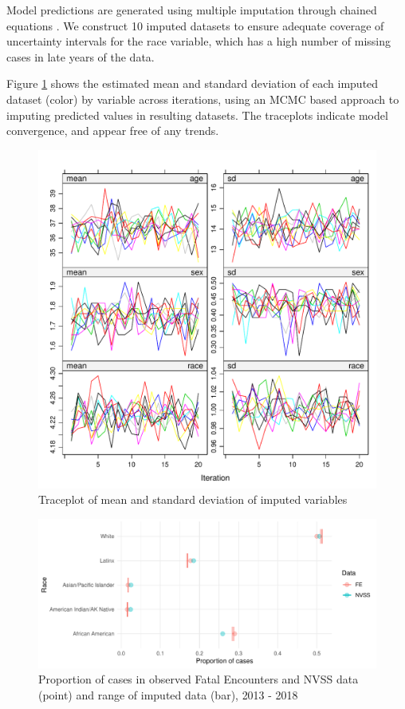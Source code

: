\documentclass[9pt,twoside,lineno]{pnas-new}
\begin{document}
Model predictions are generated using multiple imputation through chained equations \cite{buuren2010mice}. We construct 10 imputed datasets to ensure adequate coverage of uncertainty intervals for the race variable, which has a high number of missing cases in late years of the data. 

Figure \ref{fig:traceplot} shows the estimated mean and standard deviation of each imputed dataset (color) by variable across iterations, using an MCMC based approach to imputing predicted values in resulting datasets. The traceplots indicate model convergence, and appear free of any trends. 

\begin{figure}
	\centering
	\includegraphics[width = \linewidth]{vis/imp_trace.pdf}
	\caption{Traceplot of mean and standard deviation of imputed variables}
	\label{fig:traceplot}
\end{figure}

\begin{figure}
	\centering
	\includegraphics[width = \linewidth]{vis/race_impute_pct.pdf}
	\caption{Proportion of cases in observed Fatal Encounters and NVSS data (point) and range of imputed data (bar), 2013 - 2018}
	\label{fig:race_impute_pct}
\end{figure}
\end{document}

